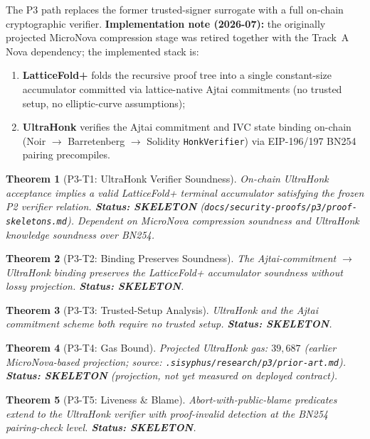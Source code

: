 \documentclass{llncs}
\newtheorem{theorem}{Theorem}[section]
\begin{document}
The P3 path replaces the former trusted-signer surrogate with a
full on-chain cryptographic verifier.  \textbf{Implementation note
(2026-07):} the originally projected MicroNova compression stage was
retired together with the Track~A Nova dependency; the implemented
stack is:

\begin{enumerate}
\item \textbf{LatticeFold+} folds the recursive proof tree into a single
  constant-size accumulator committed via lattice-native Ajtai
  commitments (no trusted setup, no elliptic-curve assumptions);
\item \textbf{UltraHonk} verifies the Ajtai commitment and IVC state
  binding on-chain (Noir $\to$ Barretenberg $\to$ Solidity
  \texttt{HonkVerifier}) via EIP-196/197 BN254 pairing precompiles.
\end{enumerate}

\begin{theorem}[P3-T1: UltraHonk Verifier Soundness]
\label{thm:p3-t1}
On-chain UltraHonk acceptance implies a valid LatticeFold+ terminal
accumulator satisfying the frozen P2 verifier relation.
\textbf{Status: SKELETON} (\texttt{docs/security-proofs/p3/proof-skeletons.md}).
Dependent on MicroNova compression soundness and UltraHonk knowledge
soundness over BN254.
\end{theorem}

\begin{theorem}[P3-T2: Binding Preserves Soundness]
\label{thm:p3-t2}
The Ajtai-commitment $\to$ UltraHonk binding preserves the LatticeFold+
accumulator soundness without lossy projection.
\textbf{Status: SKELETON}.
\end{theorem}

\begin{theorem}[P3-T3: Trusted-Setup Analysis]
\label{thm:p3-t3}
UltraHonk and the Ajtai commitment scheme both require no trusted setup.
\textbf{Status: SKELETON}.
\end{theorem}

\begin{theorem}[P3-T4: Gas Bound]
\label{thm:p3-t4}
Projected UltraHonk gas: $39{,}687$ (earlier MicroNova-based projection;
source: \texttt{.sisyphus/research/p3/prior-art.md}).
\textbf{Status: SKELETON} (projection, not yet measured on deployed contract).
\end{theorem}

\begin{theorem}[P3-T5: Liveness \& Blame]
\label{thm:p3-t5}
Abort-with-public-blame predicates extend to the UltraHonk verifier
with proof-invalid detection at the BN254
pairing-check level.
\textbf{Status: SKELETON}.
\end{theorem}
\end{document}
